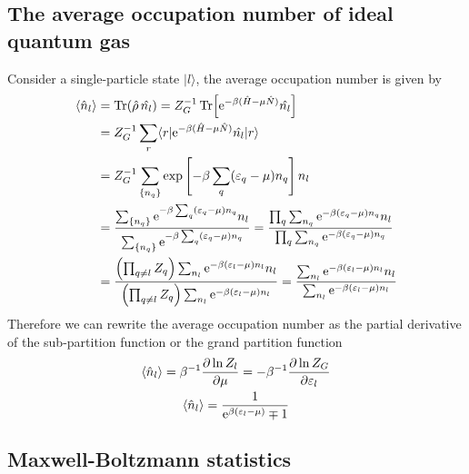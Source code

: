 \documentclass[10pt]{article}
\begin{document}
\subsection{The average occupation number of ideal quantum gas}

Consider a single-particle state $| l \rangle$, the average occupation number is given by
\begin{align*}
	\langle \hat{n}_l \rangle &= \Tr(\hat{\rho}\, \hat{n_l}) = Z_G^{-1} \Tr[{\mathrm{e}}^{-\beta(\hat{H} - \mu \hat{N})} \hat{n_l}] \\
	&= Z_G^{-1} \sum_r \langle r| {\mathrm{e}}^{-\beta(\hat{H} - \mu \hat{N})} \hat{n_l} | r \rangle \\
	&= Z_G^{-1} \sum_{\{ n_q \}} \exp\left[-\beta \sum_q ( \varepsilon_q - \mu)n_q \right] n_l \\
	&= \frac{\sum_{\{ n_q \}} {\mathrm{e}}^{-\beta \sum_q ( \varepsilon_q - \mu)n_q} n_l}{\sum_{\{ n_q \}} {\mathrm{e}}^{-\beta \sum_q ( \varepsilon_q - \mu)n_q}}
	= \frac{\prod_q \sum_{n_q} {\mathrm{e}}^{-\beta (\varepsilon_q - \mu)n_q} n_l}{\prod_q \sum_{n_q} {\mathrm{e}}^{-\beta (\varepsilon_q - \mu)n_q}} \\
	&= \frac{\left(\prod_{q \neq l} Z_q\right) \sum_{n_l} {\mathrm{e}}^{-\beta (\varepsilon_l - \mu)n_l} n_l}{\left(\prod_{q\neq l} Z_q\right) \sum_{n_l} {\mathrm{e}}^{-\beta (\varepsilon_l - \mu)n_l}}
	= \frac{\sum_{n_l} {\mathrm{e}}^{-\beta (\varepsilon_l - \mu)n_l} n_l}{\sum_{n_l} {\mathrm{e}}^{-\beta (\varepsilon_l - \mu)n_l}}
\end{align*}
Therefore we can rewrite the average occupation number as the partial derivative of the sub-partition function or the grand partition function
\begin{gather}
	\langle \hat{n}_l \rangle = \beta^{-1} \frac{\partial \ln Z_l}{\partial \mu} = - \beta^{-1} \frac{\partial \ln Z_G}{\partial \varepsilon_l} \\
	\langle \hat{n}_l \rangle = \frac{1}{{\mathrm{e}}^{\beta(\varepsilon_l - \mu)} \mp 1}
\end{gather}

\subsection{Maxwell-Boltzmann statistics}
\end{document}

